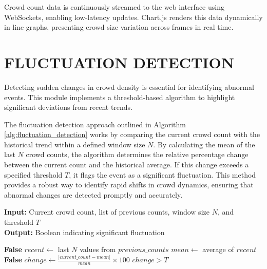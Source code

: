 
Crowd count data is continuously streamed to the web interface using WebSockets, enabling low-latency updates. Chart.js renders this data dynamically in line graphs, presenting crowd size variation across frames in real time.

\section{\MakeUppercase{Fluctuation Detection}}

Detecting sudden changes in crowd density is essential for identifying abnormal events. This module implements a threshold-based algorithm to highlight significant deviations from recent trends.

The fluctuation detection approach outlined in Algorithm \ref{alg:fluctuation_detection} works by comparing the current crowd count with the historical trend within a defined window size $N$. By calculating the mean of the last $N$ crowd counts, the algorithm determines the relative percentage change between the current count and the historical average. If this change exceeds a specified threshold $T$, it flags the event as a significant fluctuation. This method provides a robust way to identify rapid shifts in crowd dynamics, ensuring that abnormal changes are detected promptly and accurately.

\begin{algorithm}[H]
\caption{Crowd Fluctuation Detection}
\label{alg:fluctuation_detection}
\textbf{Input:} Current crowd count, list of previous counts, window size $N$, and threshold $T$\\
\textbf{Output:} Boolean indicating significant fluctuation
\begin{algorithmic}[1]
        \State \Return \textbf{False}
    \EndIf
    \State $recent \gets$ last $N$ values from $previous\_counts$
    \State $mean \gets$ average of $recent$
        \State \Return \textbf{False}
    \EndIf
    \State $change \gets \frac{|current\_count - mean|}{mean} \times 100$
    \State \Return $change > T$
\EndFunction
\end{algorithmic}
\end{algorithm}


